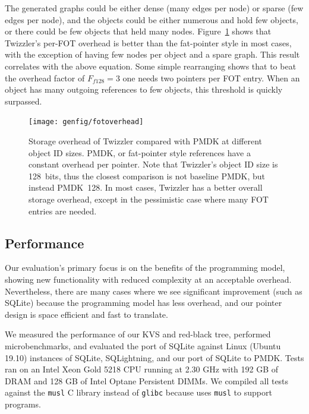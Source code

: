 The generated graphs could be either dense (many edges per node) or sparse (few edges per node), and
the objects could be either numerous and hold few objects, or there could be few objects that held
many nodes. Figure~\ref{fig:fotoverhead} shows that Twizzler's per-FOT overhead is better than the
fat-pointer style in most cases, with the exception of having few nodes per object and a spare
graph. This result correlates with the above equation. Some simple rearranging shows that to beat
the overhead factor of $F_{f128} = 3$ one needs two pointers per FOT entry. When an object has many
outgoing references to few objects, this threshold is quickly surpassed.


\begin{figure}
    \centering
    \texttt{[image: genfig/fotoverhead]}
    \caption[FOT storage overhead]{Storage overhead of Twizzler compared with PMDK at different object ID sizes. PMDK, or fat-pointer style references have a constant overhead per pointer. Note that Twizzler's object ID size is 128~bits, thus the closest comparison is not baseline PMDK, but instead PMDK~128. In most cases, Twizzler has a better overall storage overhead, except in the pessimistic case where many FOT entries are needed.}
    \label{fig:fotoverhead}
\end{figure}




\subsection{Performance}
\label{sec:res}

Our evaluation's primary focus is on the benefits of the programming model, showing new
functionality with reduced complexity at an acceptable overhead. Nevertheless, there are many
cases where we see significant improvement (such as SQLite)
because the programming model has less overhead, and our pointer design is space
efficient and fast to translate.

We measured the performance of our KVS and red-black tree, performed
microbenchmarks, and evaluated the \Twizzler port of
SQLite against Linux (Ubuntu 19.10) instances of SQLite, SQLightning, and our port of SQLite
to PMDK\@. Tests ran on an
Intel Xeon Gold 5218 CPU running at 2.30 GHz with 192 GB of DRAM and 128 GB of Intel Optane
Persistent DIMMs.
We compiled all tests against the \texttt{musl} C library instead of
\texttt{glibc} because \Twizzler uses \texttt{musl} to support \unix programs.

